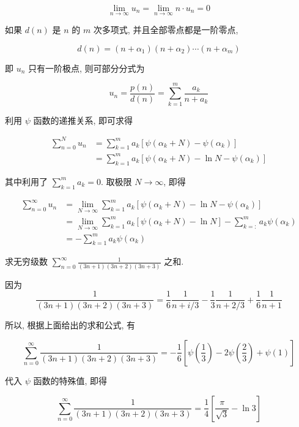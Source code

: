 $$
\lim _{n \rightarrow \infty} u_{n}=\lim _{n \rightarrow \infty} n \cdot u_{n}=0
$$

如果 $d(n)$ 是 $n$ 的 $m$ 次多项式, 并且全部零点都是一阶零点,

$$
d(n)=\left(n+\alpha_{1}\right)\left(n+\alpha_{2}\right) \cdots\left(n+\alpha_{m}\right)
$$

即 $u_{n}$ 只有一阶极点, 则可部分分式为

$$
u_{n}=\frac{p(n)}{d(n)}=\sum_{k=1}^{m} \frac{a_{k}}{n+a_{k}}
$$

利用 $\psi$ 函数的递推关系, 即可求得

$$
\begin{aligned}
\sum_{n=0}^{N} u_{n} & =\sum_{k=1}^{m} a_{k}\left[\psi\left(\alpha_{k}+N\right)-\psi\left(\alpha_{k}\right)\right] \\
& =\sum_{k=1}^{m} a_{k}\left[\psi\left(\alpha_{k}+N\right)-\ln N-\psi\left(\alpha_{k}\right)\right]
\end{aligned}
$$

其中利用了 $\sum_{k=1}^{m} a_{k}=0$. 取极限 $N \rightarrow \infty$, 即得

$$
\begin{aligned}
\sum_{n=0}^{\infty} u_{n} & =\lim _{N \rightarrow \infty} \sum_{k=1}^{m} a_{k}\left[\psi\left(\alpha_{k}+N\right)-\ln N-\psi\left(\alpha_{k}\right)\right] \\
& =\lim _{N \rightarrow \infty} \sum_{k=1}^{m} a_{k}\left[\psi\left(\alpha_{k}+N\right)-\ln N\right]-\sum_{k=:}^{m} a_{k} \psi\left(\alpha_{k}\right) \\
& =-\sum_{k=1}^{m} a_{k} \psi\left(\alpha_{k}\right)
\end{aligned}
$$

\begin{example}
求无穷级数 $\sum_{n=0}^{\infty} \frac{1}{(3 n+1)(3 n+2)(3 n+3)}$ 之和.
\end{example}
\begin{solution}
因为
$$
\frac{1}{(3 n+1)(3 n+2)(3 n+3)}=\frac{1}{6} \frac{1}{n+i / 3}-\frac{1}{3} \frac{1}{n+2 / 3}+\frac{1}{6} \frac{1}{n+1}
$$

所以, 根据上面给出的求和公式, 有

$$
\sum_{n=0}^{\infty} \frac{1}{(3 n+1)(3 n+2)(3 n+3)}=-\frac{1}{6}\left[\psi\left(\frac{1}{3}\right)-2 \psi\left(\frac{2}{3}\right)+\psi(1)\right]
$$

代入 $\psi$ 函数的特殊值, 即得

$$
\sum_{n=0}^{\infty} \frac{1}{(3 n+1)(3 n+2)(3 n+3)}=\frac{1}{4}\left[\frac{\pi}{\sqrt{3}}-\ln 3\right]
$$
\end{solution}

